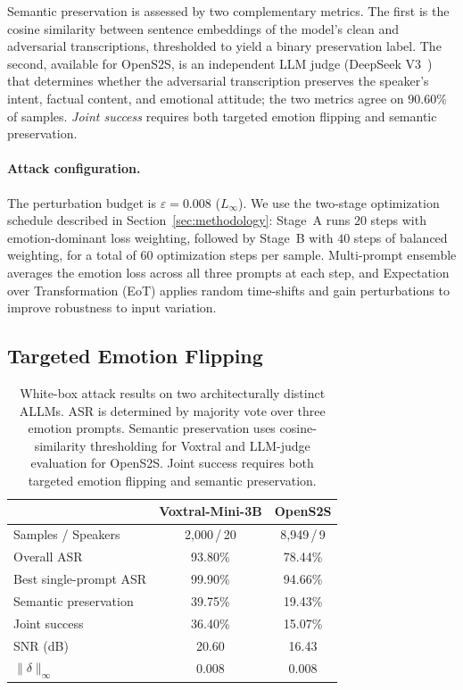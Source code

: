 Semantic preservation is assessed by two complementary metrics.
The first is the cosine similarity between sentence embeddings of the model's clean and adversarial transcriptions, thresholded to yield a binary preservation label.
The second, available for OpenS2S, is an independent LLM judge (DeepSeek V3~\cite{deepseek}) that determines whether the adversarial transcription preserves the speaker's intent, factual content, and emotional attitude; the two metrics agree on $90.60\%$ of samples.
\textit{Joint success} requires both targeted emotion flipping and semantic preservation.

\paragraph{Attack configuration.}
The perturbation budget is $\varepsilon = 0.008$ ($L_\infty$).
We use the two-stage optimization schedule described in Section~\ref{sec:methodology}: Stage~A runs $20$ steps with emotion-dominant loss weighting, followed by Stage~B with $40$ steps of balanced weighting, for a total of $60$ optimization steps per sample.
Multi-prompt ensemble averages the emotion loss across all three prompts at each step, and Expectation over Transformation (EoT) applies random time-shifts and gain perturbations to improve robustness to input variation.


\subsection{Targeted Emotion Flipping}
\label{sec:exp_asr}

\begin{table}[!t]
\centering
\small
\caption{White-box attack results on two architecturally distinct ALLMs.
ASR is determined by majority vote over three emotion prompts.
Semantic preservation uses cosine-similarity thresholding for Voxtral and LLM-judge evaluation for OpenS2S.
Joint success requires both targeted emotion flipping and semantic preservation.}
\label{tab:main_results}
\setlength{\tabcolsep}{6pt}
\begin{tabular}{l@{\hskip 14pt} c@{\hskip 12pt} c}
\toprule
 & \textbf{Voxtral-Mini-3B} & \textbf{OpenS2S} \\
\midrule
Samples / Speakers & 2{,}000\,/\,20 & 8{,}949\,/\,9 \\
\midrule
Overall ASR & 93.80\% & 78.44\% \\
Best single-prompt ASR & 99.90\% & 94.66\% \\
\midrule
Semantic preservation & 39.75\% & 19.43\% \\
Joint success & 36.40\% & 15.07\% \\
\midrule
SNR (dB) & 20.60 & 16.43 \\
$\|\delta\|_\infty$ & 0.008 & 0.008 \\
\bottomrule
\end{tabular}
\end{table}

